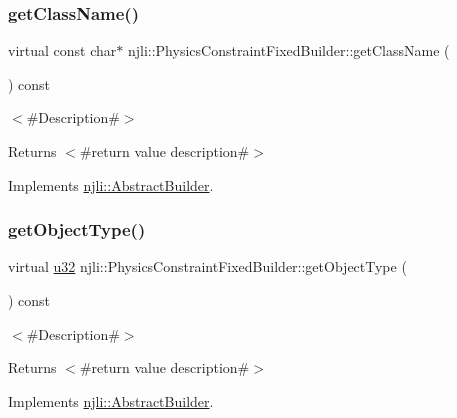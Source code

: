 \subsubsection{\texorpdfstring{get\+Class\+Name()}{getClassName()}}
{\footnotesize\ttfamily virtual const char$\ast$ njli\+::\+Physics\+Constraint\+Fixed\+Builder\+::get\+Class\+Name (\begin{DoxyParamCaption}{ }\end{DoxyParamCaption}) const\hspace{0.3cm}{\ttfamily [virtual]}}

$<$\#\+Description\#$>$

\begin{DoxyReturn}{Returns}
$<$\#return value description\#$>$ 
\end{DoxyReturn}


Implements \mbox{\hyperlink{classnjli_1_1_abstract_builder_a902f73ea78031b06aca183a417f3413b}{njli\+::\+Abstract\+Builder}}.

\mbox{\label{classnjli_1_1_physics_constraint_fixed_builder_ac9dc0e37cd6501eb1748e993df8cdcb6}} 
\subsubsection{\texorpdfstring{get\+Object\+Type()}{getObjectType()}}
{\footnotesize\ttfamily virtual \mbox{\hyperlink{_util_8h_a10e94b422ef0c20dcdec20d31a1f5049}{u32}} njli\+::\+Physics\+Constraint\+Fixed\+Builder\+::get\+Object\+Type (\begin{DoxyParamCaption}{ }\end{DoxyParamCaption}) const\hspace{0.3cm}{\ttfamily [virtual]}}

$<$\#\+Description\#$>$

\begin{DoxyReturn}{Returns}
$<$\#return value description\#$>$ 
\end{DoxyReturn}


Implements \mbox{\hyperlink{classnjli_1_1_abstract_builder_a0f2d344fcf697b167f4f2b1122b5fb33}{njli\+::\+Abstract\+Builder}}.

\mbox{\label{classnjli_1_1_physics_constraint_fixed_builder_a0ba145723f8f735d2b3cc2f5c9e5e9a5}} 
